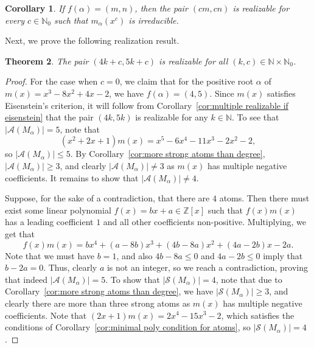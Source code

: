 \documentclass[11pt]{amsart}
\newtheorem{theorem}{Theorem}[section]
\newtheorem{corollary}[theorem]{Corollary}
\theoremstyle{definition}
\theoremstyle{remark}
\numberwithin{equation}{section}
\newcommand{\nn}{\mathbb{N}}
\newcommand{\zz}{\mathbb{Z}}
\begin{document}
\begin{corollary}
    If $f(\alpha) = (m,n)$, then the pair $(cm, cn)$ is realizable for every $c \in \nn_0$ such that $m_\alpha(x^c)$ is irreducible. 
\end{corollary}
\medskip

Next, we prove the following realization result.

\begin{theorem} \label{thm:4k_5k_realize}
    The pair $(4k+c,5k+c)$ is realizable for all $(k,c) \in \nn \times \nn_0$.
\end{theorem}

\begin{proof}
    For the case when $c=0$, we claim that for the positive root $\alpha$ of $m(x) = x^3 - 8x^2 + 4x - 2$, we have $f(\alpha) = (4,5)$. Since $m(x)$ satisfies Eisenstein's criterion, it will follow from Corollary~\ref{cor:multiple realizable if eisenstein} that the pair $(4k,5k)$ is realizable for any $k \in \nn$. To see that $|\mathcal{A}(M_\alpha)| = 5$, note that
    \[
    	(x^2+2x+1)m(x) = x^5 - 6x^4 - 11x^3 - 2x^2 - 2,
    \]
    so $|\mathcal{A}(M_\alpha)|\le 5$. By Corollary~\ref{cor:more strong atoms than degree}, $|\mathcal{A}(M_\alpha)| \ge 3$, and clearly $|\mathcal{A}(M_\alpha)|\ne 3$ as $m(x)$ has multiple negative coefficients. It remains to show that $|\mathcal{A}(M_\alpha)| \ne 4$.
    
    Suppose, for the sake of a contradiction, that there are $4$ atoms. Then there must exist some linear polynomial $f(x) = bx+a \in \zz[x]$ such that $f(x)m(x)$ has a leading coefficient $1$ and all other coefficients non-positive. Multiplying, we get that
    \[
        f(x)m(x) = bx^4 + (a-8b)x^3 + (4b-8a)x^2 + (4a-2b)x - 2a.
    \]
    Note that we must have $b=1$, and also $4b-8a\le 0$ and $4a-2b\le 0$ imply that $b-2a=0$. Thus, clearly $a$ is not an integer, so we reach a contradiction, proving that indeed $|\mathcal{A}(M_\alpha)| = 5$. To show that $|\mathcal{S}(M_\alpha)| = 4$, note that due to Corollary~\ref{cor:more strong atoms than degree}, we have $|\mathcal{S}(M_\alpha)|\ge 3$, and clearly there are more than three strong atoms as $m(x)$ has multiple negative coefficients. Note that $(2x+1)m(x) = 2x^4-15x^3-2$, which satisfies the conditions of Corollary~\ref{cor:minimal poly condition for atoms}, so $|\mathcal{S}(M_\alpha)| = 4$.
    \smallskip
    

\end{proof}
\end{document}
